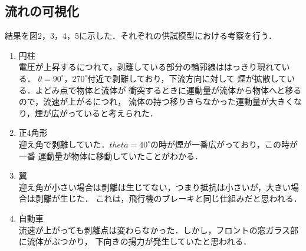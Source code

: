 \documentclass[twocolumn,10pt,a4j]{jsarticle}
\begin{document}
    \subsection{流れの可視化}
      結果を図2，3，4，5に示した．それぞれの供試模型における考察を行う．
      \begin{enumerate}
        \item 円柱 \\
          電圧が上昇するにつれて，剥離している部分の輪郭線ははっきり現れている．
          $\theta = 90^\circ， 270^\circ$付近で剥離しており，下流方向に対して
          煙が拡散している．よどみ点で物体と流体が
          衝突するときに運動量が流体から物体へと移るので，流速が上がるにつれ，
          流体の持つ移りきらなかった運動量が大きくなり，煙が広がっていると考えられた．
        \item 正4角形 \\
          迎え角で剥離していた．$theta=40^\circ$の時が煙が一番広がっており，この時が一番
          運動量が物体に移動していたことがわかる．
        \item 翼 \\
          迎え角が小さい場合は剥離は生じてない，つまり抵抗は小さいが，大きい場合は剥離が生じた．
          これは，飛行機のブレーキと同じ仕組みだと思われる．
        \item 自動車 \\
          流速が上がっても剥離点は変わらなかった．しかし，フロントの窓ガラス部に流体がぶつかり，
          下向きの揚力が発生していたと思われる．
      \end{enumerate}
\end{document}
